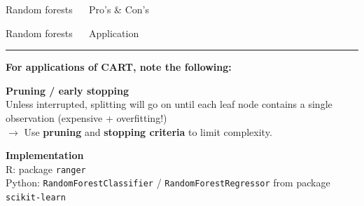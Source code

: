 \documentclass[11pt,compress,t,notes=noshow, xcolor=table]{beamer}
\begin{document}
\begin{frame}{\textcolor{gray!80}{Random forests} ~~ Pro's \& Con's}
\vfill

\small


\end{frame}


\LARGE
\begin{frame}{\textcolor{gray!80}{Random forests} ~~ Application}
\normalsize
\vspace{-0.5cm}
\noindent \textcolor{gray!80}{\rule{\textwidth}{1pt}}

\vspace{0.3cm}

\textbf{For applications of CART, note the following:}
\lz

\textbf{\textcolor{gray!80}{Pruning / early stopping}} \\
\smallskip
Unless interrupted, splitting will go on until each leaf node contains a single 
observation (expensive + overfitting!) \\
\smallskip
$\rightarrow$ Use \textbf{pruning} and \textbf{stopping criteria} to limit 
complexity.

\lz
\textbf{\textcolor{gray!80}{Implementation}} \\
\smallskip
R: package \texttt{ranger}\\
Python: \texttt{RandomForestClassifier} / \texttt{RandomForestRegressor} from 
package \texttt{scikit-learn}

\end{frame}

\end{document}
